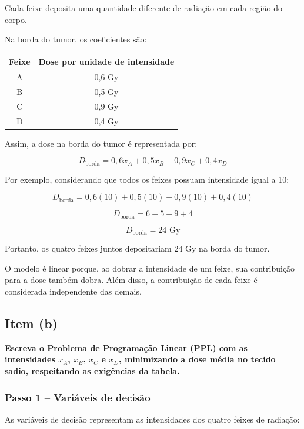 \documentclass[12pt,a4paper]{article}
\begin{document}
Cada feixe deposita uma quantidade diferente de
radiação em cada região do corpo.

Na borda do tumor, os coeficientes são:

\begin{center}
\begin{tabular}{cc}
\toprule
\textbf{Feixe} & \textbf{Dose por unidade de intensidade} \\
\midrule
A & 0,6 Gy \\
B & 0,5 Gy \\
C & 0,9 Gy \\
D & 0,4 Gy \\
\bottomrule
\end{tabular}
\end{center}

Assim, a dose na borda do tumor é representada por:

\[
D_{\text{borda}} =
0{,}6x_A + 0{,}5x_B + 0{,}9x_C + 0{,}4x_D
\]

Por exemplo, considerando que todos os feixes
possuam intensidade igual a 10:

\[
D_{\text{borda}} =
0{,}6(10) + 0{,}5(10) + 0{,}9(10) + 0{,}4(10)
\]

\[
D_{\text{borda}} = 6 + 5 + 9 + 4
\]

\[
\boxed{D_{\text{borda}} = 24\text{ Gy}}
\]

Portanto, os quatro feixes juntos depositariam
24 Gy na borda do tumor.

O modelo é linear porque, ao dobrar a intensidade
de um feixe, sua contribuição para a dose também
dobra. Além disso, a contribuição de cada feixe
é considerada independente das demais.

\newpage

\subsection*{Item (b)}

\textbf{Escreva o Problema de Programação Linear
(PPL) com as intensidades
$x_A$, $x_B$, $x_C$ e $x_D$,
minimizando a dose média no tecido sadio,
respeitando as exigências da tabela.}

\subsubsection*{Passo 1 -- Variáveis de decisão}

As variáveis de decisão representam as intensidades
dos quatro feixes de radiação:
\end{document}
